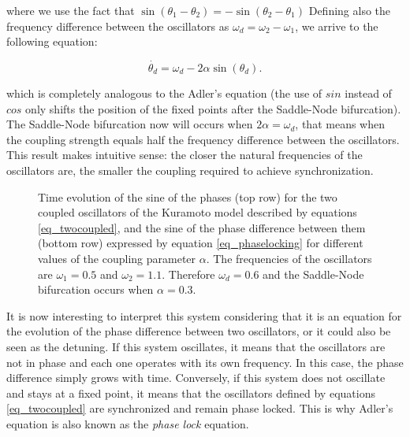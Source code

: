 \documentclass{article}
\begin{document}
where we use the fact that $\sin(\theta_1 - \theta_2) = - \sin(\theta_2 - \theta_1)$
Defining also the frequency difference between the oscillators as $\omega_d = \omega_2 - \omega_1$, we arrive to the following equation:

\begin{equation} \label{eq_phaselocking}
    \dot{\theta_d} = \omega_d - 2\alpha \sin(\theta_d).
\end{equation}

which is completely analogous to the Adler's equation (the use of $sin$ instead of $cos$ only shifts the position of the fixed points after the Saddle-Node bifurcation). The Saddle-Node bifurcation now will occurs when $2\alpha = \omega_d$, that means when the coupling strength equals half the frequency difference between the oscillators. 
This result makes intuitive sense: the closer the natural frequencies of the oscillators are, the smaller the coupling required to achieve synchronization.


\begin{figure} [h]
    \centerline{}
    \caption{Time evolution of the sine of the phases (top row) for the  two coupled oscillators of the Kuramoto model described by equations \ref{eq_twocoupled}, and the sine of the phase difference between them (bottom row) expressed by equation \ref{eq_phaselocking} for different values of the coupling parameter $\alpha$. The frequencies of the oscillators are $\omega_1=0.5$ and $\omega_2=1.1$. Therefore $\omega_d=0.6$ and the Saddle-Node bifurcation occurs when $\alpha=0.3$.
    }
    \label{fig_twocoupled}
\end{figure}

\newpage

It is now interesting to interpret this system considering that it is an equation for the evolution of the phase difference between two oscillators, or it could also be seen as the detuning. 
If this system oscillates, it means that the oscillators are not in phase and each one operates with its own frequency. In this case, the phase difference simply grows with time. 
Conversely, if this system does not oscillate and stays at a fixed point, it means that the oscillators defined by equations \ref{eq_twocoupled} are synchronized and remain phase locked. 
This is why Adler's equation is also known as the {\em phase lock} equation.
\end{document}

